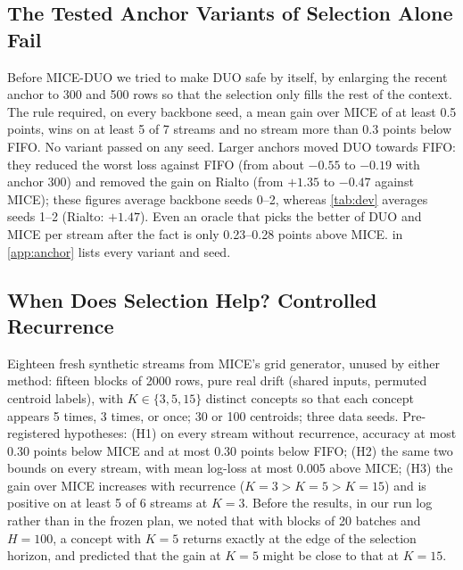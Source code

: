 \documentclass{article}
\theoremstyle{plain}
\theoremstyle{definition}
\theoremstyle{remark}
\newcommand{\mice}{\textsc{MICE}}
\newcommand{\duo}{\textsc{DUO}}
\newcommand{\method}{\textsc{MICE-DUO}}
\begin{document}
\subsection{The Tested Anchor Variants of Selection Alone Fail}
\label{sec:exp-anchor}

Before \method{} we tried to make \duo{} safe by itself, by enlarging the recent anchor to 300 and 500 rows so that the
selection only fills the rest of the context. The rule required, on every backbone seed, a mean gain over \mice{} of
at least 0.5 points, wins on at least 5 of 7 streams and no stream more than 0.3 points below FIFO. No variant passed
on any seed. Larger anchors moved \duo{} towards FIFO: they reduced the worst loss against FIFO (from about $-0.55$ to
$-0.19$ with anchor 300) and removed the gain on Rialto (from $+1.35$ to $-0.47$ against \mice{}); these figures average backbone seeds
0--2, whereas \cref{tab:dev} averages seeds 1--2 (Rialto: $+1.47$). Even an oracle that
picks the better of \duo{} and \mice{} per stream after the fact is only 0.23--0.28 points above \mice{}.
 in \cref{app:anchor} lists every variant and seed.

\subsection{When Does Selection Help? Controlled Recurrence}
\label{sec:exp-mech}

Eighteen fresh synthetic streams from \mice{}'s grid generator, unused by either method: fifteen blocks of 2000 rows,
pure real drift (shared inputs, permuted centroid labels), with $K\in\{3,5,15\}$ distinct concepts so that each
concept appears 5 times, 3 times, or once; 30 or 100 centroids; three data seeds. Pre-registered hypotheses:
(H1) on every stream without recurrence, accuracy at most 0.30 points below \mice{} and at most 0.30 points below
FIFO; (H2) the same two bounds on every stream,
with mean log-loss at most 0.005 above \mice{}; (H3) the gain over \mice{}
increases with recurrence ($K=3>K=5>K=15$) and is positive on at least 5 of 6 streams at $K=3$. Before the results, in our run log rather than in the frozen plan, we
noted that with blocks of 20 batches and $H=100$, a concept with $K=5$ returns exactly at the edge of the selection
horizon, and predicted that the gain at $K=5$ might be close to that at $K=15$.
\end{document}
